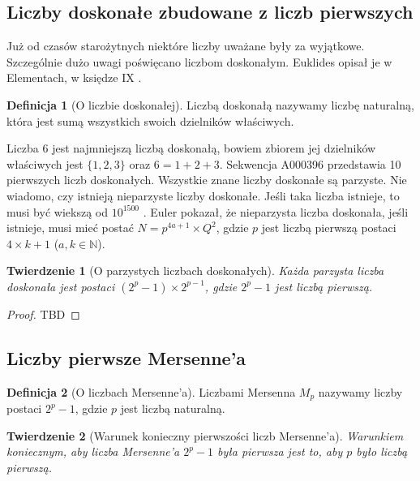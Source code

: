 \documentclass[10pt,onecolumn]{article}
\newtheorem{theorem}{Twierdzenie}
\theoremstyle{definition}
\newtheorem{definition}{Definicja}
\theoremstyle{hypothesis}
\theoremstyle{capability}
\begin{document}
\subsection{Liczby doskonałe zbudowane z liczb pierwszych}

Już od czasów starożytnych niektóre liczby uważane były za wyjątkowe. Szczególnie dużo uwagi poświęcano liczbom doskonałym. Euklides opisał je w Elementach, w księdze IX \cite{euklides}.

\begin{definition} [O liczbie doskonałej]
Liczbą doskonałą nazywamy liczbę naturalną, która jest sumą wszystkich swoich dzielników właściwych.
\end{definition}

Liczba $6$ jest najmniejszą liczbą doskonałą, bowiem zbiorem jej dzielników właściwych jest $\lbrace 1, 2, 3 \rbrace$ oraz $6 = 1 + 2 +3$. Sekwencja A000396 przedstawia 10 pierwszych liczb doskonałych.
Wszystkie znane liczby doskonałe są parzyste. Nie wiadomo, czy istnieją nieparzyste liczby doskonałe. Jeśli taka liczba istnieje, to musi być wiekszą od $10^{1500}$ \cite{ochemrao2012}. Euler pokazał, że nieparzysta liczba doskonała, jeśli istnieje, musi mieć postać $N = p^{4a+1} \times Q^2$, gdzie $p$ jest liczbą pierwszą postaci $4 \times k+1$ ($a, k \in \mathbb{N}$).

\begin{theorem}[O parzystych liczbach doskonałych]
Każda parzysta liczba doskonała jest postaci $(2^p - 1) \times 2^{p - 1}$, gdzie $2^p - 1$ jest liczbą pierwszą.
\end{theorem}

\begin{proof}
TBD
\end{proof}

\subsection{Liczby pierwsze Mersenne'a}

\begin{definition} [O liczbach Mersenne'a]
Liczbami Mersenna $M_p$ nazywamy liczby postaci $2^p - 1$, gdzie $p$ jest liczbą naturalną.
\end{definition}

\begin{theorem}[Warunek konieczny pierwszości liczb Mersenne'a]
Warunkiem koniecznym, aby liczba Mersenne'a $2^p - 1$ była pierwsza jest to, aby $p$ było liczbą pierwszą.
\end{theorem}
\end{document}
